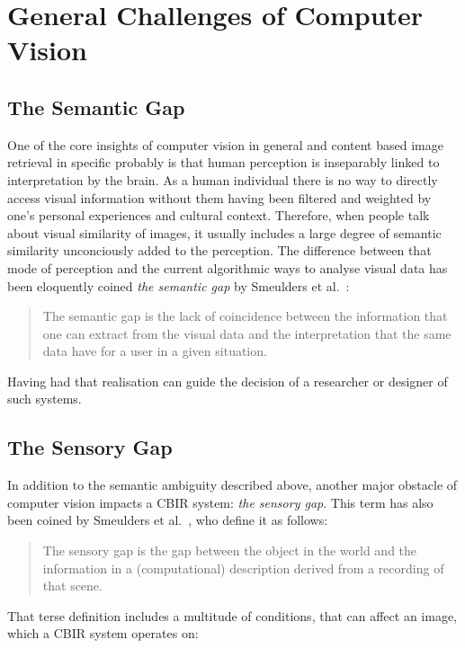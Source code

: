 \section{General Challenges of Computer Vision}

\subsection{The Semantic Gap}

One of the core insights of computer vision in general and content based image
retrieval in specific probably is that human perception is inseparably linked
to interpretation by the brain. As a human individual there is no way to
directly access visual information without them having been filtered and
weighted by one's personal experiences and cultural context. Therefore, when
people talk about visual similarity of images, it usually includes a large
degree of semantic similarity unconciously added to the perception. The
difference between that mode of perception and the current algorithmic ways to
analyse visual data has been eloquently coined \emph{the semantic gap} by
Smeulders et al.\ \autocite{smeulders_content-based_2000}:

\begin{quote}
The semantic gap is the lack of coincidence between the information that one
can extract from the visual data and the interpretation that the same data have
for a user in a given situation.
\end{quote}

Having had that realisation can guide the decision of a researcher or designer
of such systems.

\subsection{The Sensory Gap}

In addition to the semantic ambiguity described above, another major obstacle
of computer vision impacts a CBIR system: \emph{the sensory gap}. This term has
also been coined by Smeulders et al.\ \autocite{smeulders_content-based_2000},
who define it as follows:

\begin{quote}
The sensory gap is the gap between the object in the world and the information
in a (computational) description derived from a recording of that scene.
\end{quote}

That terse definition includes a multitude of conditions, that can affect an
image, which a CBIR system operates on:

